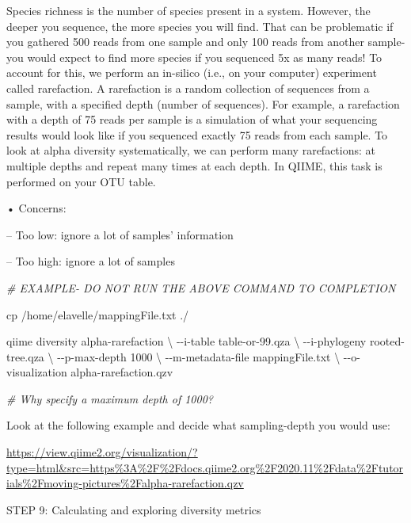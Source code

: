 \documentclass[
]{book}
\newenvironment{Shaded}{\begin{snugshade}}{\end{snugshade}}
\newcommand{\CommentTok}[1]{\textcolor[rgb]{0.56,0.35,0.01}{\textit{#1}}}
\newcommand{\DataTypeTok}[1]{\textcolor[rgb]{0.13,0.29,0.53}{#1}}
\newcommand{\ExtensionTok}[1]{#1}
\newcommand{\FunctionTok}[1]{\textcolor[rgb]{0.00,0.00,0.00}{#1}}
\newcommand{\NormalTok}[1]{#1}
\begin{document}
Species richness is the number of species present in a system. However, the deeper you sequence, the more species you will find. That can be problematic if you gathered 500 reads from one sample and only 100 reads from another sample- you would expect to find more species if you sequenced 5x as many reads! To account for this, we perform an in-silico (i.e., on your computer) experiment called rarefaction. A rarefaction is a random collection of sequences from a sample, with a specified depth (number of sequences). For example, a rarefaction with a depth of 75 reads per sample is a simulation of what your sequencing results would look like if you sequenced exactly 75 reads from each sample. To look at alpha diversity systematically, we can perform many rarefactions: at multiple depths and repeat many times at each depth. In QIIME, this task is performed on your OTU table.

• Concerns:

-- Too low: ignore a lot of samples' information

-- Too high: ignore a lot of samples

\begin{Shaded}
\begin{Highlighting}[]

\CommentTok{\# EXAMPLE{-} DO NOT RUN THE ABOVE COMMAND TO COMPLETION}

\FunctionTok{cp}\NormalTok{ /home/elavelle/mappingFile.txt ./}

\ExtensionTok{qiime}\NormalTok{ diversity alpha{-}rarefaction }\DataTypeTok{\textbackslash{}}
\NormalTok{{-}{-}i{-}table table{-}or{-}99.qza }\DataTypeTok{\textbackslash{}}
\NormalTok{{-}{-}i{-}phylogeny rooted{-}tree.qza }\DataTypeTok{\textbackslash{}}
\NormalTok{{-}{-}p{-}max{-}depth 1000 }\DataTypeTok{\textbackslash{}}
\NormalTok{{-}{-}m{-}metadata{-}file mappingFile.txt }\DataTypeTok{\textbackslash{}}
\NormalTok{{-}{-}o{-}visualization alpha{-}rarefaction.qzv}

\CommentTok{\# Why specify a maximum depth of 1000?}
\end{Highlighting}
\end{Shaded}

Look at the following example and decide what sampling-depth you would use:

\url{https://view.qiime2.org/visualization/?type=html\&src=https\%3A\%2F\%2Fdocs.qiime2.org\%2F2020.11\%2Fdata\%2Ftutorials\%2Fmoving-pictures\%2Falpha-rarefaction.qzv}

STEP 9: Calculating and exploring diversity metrics
\end{document}
